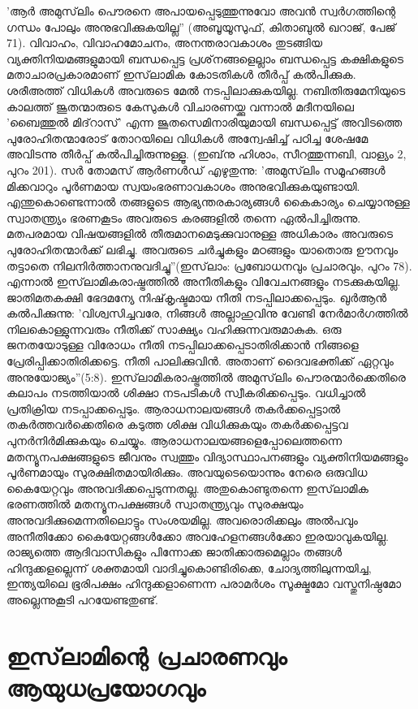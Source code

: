 'ആര്‍ അമുസ്‌ലിം പൌരനെ അപായപ്പെടുത്തുന്നുവോ അവന്‍ സ്വര്‍ഗത്തിന്റെ ഗന്ധം പോലും അനുഭവിക്കുകയില്ല'' (അബൂയൂസുഫ്, കിതാബുല്‍ ഖറാജ്, പേജ് 71).
വിവാഹം, വിവാഹമോചനം, അനന്തരാവകാശം തുടങ്ങിയ വ്യക്തിനിയമങ്ങളുമായി ബന്ധപ്പെട്ട പ്രശ്‌നങ്ങളെല്ലാം ബന്ധപ്പെട്ട കക്ഷികളുടെ മതാചാരപ്രകാരമാണ് ഇസ്‌ലാമിക കോടതികള്‍ തീര്‍പ്പ് കല്‍പിക്കുക. ശരീഅത്ത് വിധികള്‍ അവരുടെ മേല്‍ നടപ്പിലാക്കുകയില്ല. നബിതിരുമേനിയുടെ കാലത്ത് ജൂതന്മാരുടെ കേസുകള്‍ വിചാരണയ്ക്കു വന്നാല്‍ മദീനയിലെ 'ബൈത്തുല്‍ മിദ്‌റാസ്' എന്ന ജൂതസെമിനാരിയുമായി ബന്ധപ്പെട്ട് അവിടത്തെ പുരോഹിതന്മാരോട് തോറയിലെ വിധികള്‍ അന്വേഷിച്ച് പഠിച്ച ശേഷമേ അവിടന്നു തീര്‍പ്പ് കല്‍പിച്ചിരുന്നുള്ളൂ. (ഇബ്‌നു ഹിശാം, സീറത്തുന്നബി, വാള്യം 2, പുറം 201).
സര്‍ തോമസ് ആര്‍ണള്‍ഡ് എഴുതുന്നു: 'അമുസ്‌ലിം സമൂഹങ്ങള്‍ മിക്കവാറും പൂര്‍ണമായ സ്വയംഭരണാവകാശം അനുഭവിക്കുകയുണ്ടായി. എന്തുകൊണ്ടെന്നാല്‍ തങ്ങളുടെ ആഭ്യന്തരകാര്യങ്ങള്‍ കൈകാര്യം ചെയ്യാനുള്ള സ്വാതന്ത്യ്രം ഭരണകൂടം അവരുടെ കരങ്ങളില്‍ തന്നെ ഏല്‍പിച്ചിരുന്നു. മതപരമായ വിഷയങ്ങളില്‍ തീരുമാനമെടുക്കുവാനുള്ള അധികാരം അവരുടെ പുരോഹിതന്മാര്‍ക്ക് ലഭിച്ചു. അവരുടെ ചര്‍ച്ചുകളും മഠങ്ങളും യാതൊരു ഊനവും തട്ടാതെ നിലനിര്‍ത്താനനുവദിച്ചു''(ഇസ്‌ലാം: പ്രബോധനവും പ്രചാരവും, പുറം 78).
എന്നാല്‍ ഇസ്‌ലാമികരാഷ്ട്രത്തില്‍ അനീതികളും വിവേചനങ്ങളും നടക്കുകയില്ല. ജാതിമതകക്ഷി ഭേദമന്യേ നിഷ്‌കൃഷ്ടമായ നീതി നടപ്പിലാക്കപ്പെടും. ഖുര്‍ആന്‍ കല്‍പിക്കുന്നു: 'വിശ്വസിച്ചവരേ, നിങ്ങള്‍ അല്ലാഹുവിനു വേണ്ടി നേര്‍മാര്‍ഗത്തില്‍ നിലകൊള്ളുന്നവരും നീതിക്ക് സാക്ഷ്യം വഹിക്കുന്നവരുമാകുക. ഒരു ജനതയോടുള്ള വിരോധം നീതി നടപ്പിലാക്കപ്പെടാതിരിക്കാന്‍ നിങ്ങളെ പ്രേരിപ്പിക്കാതിരിക്കട്ടെ. നീതി പാലിക്കുവിന്‍. അതാണ് ദൈവഭക്തിക്ക് ഏറ്റവും അനുയോജ്യം''(5:8).
ഇസ്‌ലാമികരാഷ്ട്രത്തില്‍ അമുസ്‌ലിം പൌരന്മാര്‍ക്കെതിരെ കലാപം നടത്തിയാല്‍ ശിക്ഷാ നടപടികള്‍ സ്വീകരിക്കപ്പെടും. വധിച്ചാല്‍ പ്രതിക്രിയ നടപ്പാക്കപ്പെടും. ആരാധനാലയങ്ങള്‍ തകര്‍ക്കപ്പെട്ടാല്‍ തകര്‍ത്തവര്‍ക്കെതിരെ കടുത്ത ശിക്ഷ വിധിക്കുകയും തകര്‍ക്കപ്പെട്ടവ പുനര്‍നിര്‍മിക്കുകയും ചെയ്യും. ആരാധനാലയങ്ങളെപ്പോലെത്തന്നെ മതന്യൂനപക്ഷങ്ങളുടെ ജീവനും സ്വത്തും വിദ്യാസ്ഥാപനങ്ങളും വ്യക്തിനിയമങ്ങളും പൂര്‍ണമായും സുരക്ഷിതമായിരിക്കും. അവയുടെയൊന്നും നേരെ ഒരുവിധ കൈയേറ്റവും അനുവദിക്കപ്പെടുന്നതല്ല. അതുകൊണ്ടുതന്നെ ഇസ്‌ലാമിക ഭരണത്തില്‍ മതന്യൂനപക്ഷങ്ങള്‍ സ്വാതന്ത്യ്രവും സുരക്ഷയും അനുവദിക്കുമെന്നതിലൊട്ടും സംശയമില്ല. അവരൊരിക്കലും അല്‍പവും അനീതിക്കോ കൈയേറ്റങ്ങള്‍ക്കോ അവഹേളനങ്ങള്‍ക്കോ ഇരയാവുകയില്ല.
രാജ്യത്തെ ആദിവാസികളും പിന്നോക്ക ജാതിക്കാരുമെല്ലാം തങ്ങള്‍ ഹിന്ദുക്കളല്ലെന്ന് ശക്തമായി വാദിച്ചുകൊണ്ടിരിക്കെ, ചോദ്യത്തിലുന്നയിച്ച, ഇന്ത്യയിലെ ഭൂരിപക്ഷം ഹിന്ദുക്കളാണെന്ന പരാമര്‍ശം സൂക്ഷ്മമോ വസ്തുനിഷ്ഠമോ അല്ലെന്നുകൂടി പറയേണ്ടതുണ്ട്.
\chapter{ഇസ്‌ലാമിന്റെ പ്രചാരണവും ആയുധപ്രയോഗവും} 

